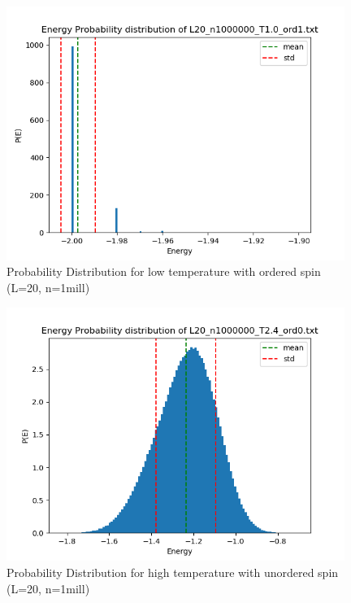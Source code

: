 \documentclass{article}
\begin{document}
  \begin{figure}[ht]
      \centering
      \includegraphics[width = 11cm]{img/energyhistogram_L20_n1000000_T10_ord1.png}
      \caption{Probability Distribution for low temperature with ordered spin (L=20, n=1mill)}
      \label{fig:prob-lowT-ord1}
    \end{figure}

  \begin{figure}[ht]
      \centering
      \includegraphics[width = 11cm]{img/energyhistogram_L20_n1000000_T24_ord0.png}
      \caption{Probability Distribution for high temperature with unordered spin (L=20, n=1mill)}
      \label{fig:prob-highT-ord0}
    \end{figure}
\end{document}
